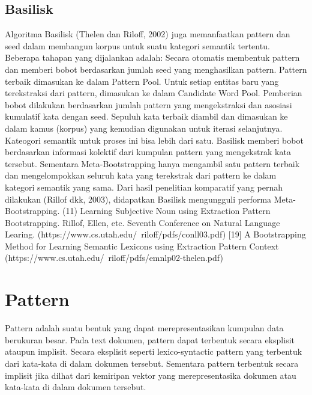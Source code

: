 \subsection{Basilisk}
Algoritma Basilisk (Thelen dan Riloff, 2002) juga memanfaatkan pattern dan seed dalam membangun korpus untuk suatu kategori semantik tertentu. Beberapa tahapan yang dijalankan adalah:
Secara otomatis membentuk pattern dan memberi bobot berdasarkan jumlah seed yang menghasilkan pattern. Pattern terbaik dimasukan ke dalam Pattern Pool.
Untuk setiap entitas baru yang terekstraksi dari pattern, dimasukan ke dalam Candidate Word Pool. Pemberian bobot dilakukan berdasarkan jumlah pattern yang mengekstraksi dan asosiasi kumulatif kata dengan seed.
Sepuluh kata terbaik diambil dan dimasukan ke dalam kamus (korpus) yang kemudian digunakan untuk iterasi selanjutnya. 
Kateogori semantik untuk proses ini bisa lebih dari satu. Basilisk memberi bobot berdasarkan informasi kolektif dari kumpulan pattern yang mengekstrak kata tersebut. Sementara Meta-Bootstrapping hanya mengambil satu pattern terbaik dan mengelompokkan seluruh kata yang terekstrak dari pattern ke dalam kategori semantik yang sama. Dari hasil penelitian komparatif yang pernah dilakukan (Rillof dkk, 2003), didapatkan Basilisk mengungguli performa Meta-Bootstrapping. 
(11) Learning Subjective Noun using Extraction Pattern Bootstrapping. Rillof, Ellen, etc. Seventh Conference on Natural Language Learing.  (https://www.cs.utah.edu/~riloff/pdfs/conll03.pdf)
[19] A Bootstrapping Method for Learning Semantic Lexicons using Extraction Pattern Context (https://www.cs.utah.edu/~riloff/pdfs/emnlp02-thelen.pdf)


\section{Pattern}
Pattern adalah suatu bentuk yang dapat merepresentasikan kumpulan data berukuran besar. Pada text dokumen, pattern dapat terbentuk secara eksplisit ataupun implisit. Secara eksplisit seperti lexico-syntactic pattern yang terbentuk dari kata-kata di dalam dokumen tersebut. Sementara pattern terbentuk secara implisit jika dilhat dari kemiripan vektor yang merepresentasika dokumen atau kata-kata di dalam dokumen tersebut.


